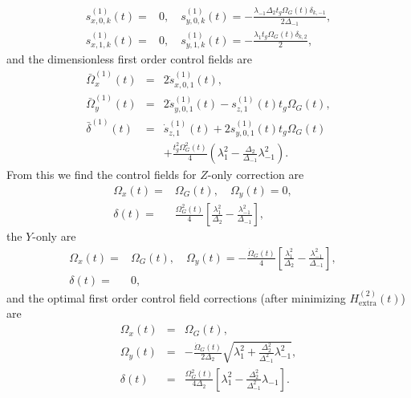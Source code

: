 \documentclass[pra,twocolumn,floatfix,superscriptaddress,eqsecnum]{revtex4-1}
\begin{document}
\begin{equation}
\begin{split}
  s^{(1)}_{x,0,k}(t) = &0,\quad s^{(1)}_{y,0,k}(t) =-\frac{\lambda_{-1}\Delta_{2} t_g\Omega_{G}(t)\delta_{k,-1}}{2\Delta_{-1}},\\ s^{(1)}_{x,1,k}(t) = &0,\quad s^{(1)}_{y,1,k} (t)= -\frac{\lambda_1 t_g\Omega_{G}(t)\delta_{k,2}}{2},
\end{split}
\end{equation}
 and the dimensionless first order control fields are
\begin{eqnarray}
\bar\Omega_{x}^{(1)} (t) &=&  2\dot{s}^{(1)}_{x,0,1} (t) ,\\
 \bar\Omega_{y}^{(1)}(t) &=&   2 \dot{s}^{(1)}_{y,0,1} (t)-s^{(1)}_{z,1} (t)t_g\Omega_G (t),\\
  \bar\delta^{(1)} (t) &= &\dot{s}^{(1)}_{z,1}(t) + 2 s^{(1)}_{y,0,1}(t)t_g\Omega_G(t) \\&&+ \frac{t_g^2\Omega_G^2(t)}{4}\textstyle{\left(\lambda_1^2 -\frac{\Delta_{2}}{\Delta_{-1}}\lambda_{-1}^2 \right).}
\end{eqnarray}
From this we find the control fields for $Z$-only correction are
\begin{equation}
\begin{split}
\Omega_{x}(t) =&  \Omega_G(t) ,\quad
\Omega_{y}(t) =  0,\quad\\
\delta(t) =& \frac{ \Omega_G^2(t)}{4}{\textstyle{ \left[\frac{\lambda_{1}^2}{\Delta_2}-\frac{\lambda_{-1}^2}{\Delta_{-1}}\right]}},
  \end{split}
\end{equation}
 the $Y$-only are
\begin{equation}
\begin{split}
\Omega_{x}(t) = &  \Omega_G(t) ,\quad
\Omega_{y}(t) =  -\frac{\dot\Omega_G(t)}{4}{\textstyle{\left[\frac{\lambda_{1}^2}{\Delta_2}-\frac{\lambda_{-1}^2}{\Delta_{-1}}\right],}}\quad\\
\delta(t) =& 0,
  \end{split}
\end{equation}
and the optimal first order control field corrections (after minimizing  $H_\mathrm{extra}^{(2)}(t)$) are
\begin{eqnarray}
\Omega_{x}(t) &= &  \Omega_G(t) ,\\
\Omega_{y}(t) &=&  -\frac{\dot\Omega_G(t)}{2\Delta_2}{\textstyle{\sqrt{\lambda_1^2+{{\frac{\Delta_2^2}{\Delta_{-1}^2}}}\lambda_{-1}^2}},}\\
\delta(t) &=&\frac{ \Omega_G^2(t)}{4\Delta_2}{\textstyle{\left[\lambda_1^2-\frac{\Delta_2^2}{\Delta_{-1}^2}\lambda_{-1}\right]}}.
\end{eqnarray}
\end{document}
